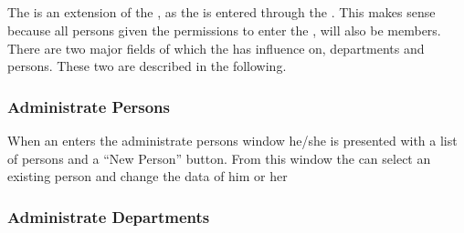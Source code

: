 \subsection{\ainterface}
\label{sec:admininterface}

The \ainterface[] is an extension of the \sinterface[], as the \ainterface[] is entered through the \sinterface[].
This makes sense because all persons given the permissions to enter the \ainterface[], will also be \astaff[] members.
There are two major fields of which the \admin[] has influence on, departments and persons.
These two are described in the following.

\subsubsection{Administrate Persons}
When an \admin[] enters the administrate persons window he/she is presented with a list of persons and a ``New Person'' button.
From this window the \admin[] can select an existing person and change the data of him or her 

\subsubsection{Administrate Departments}



